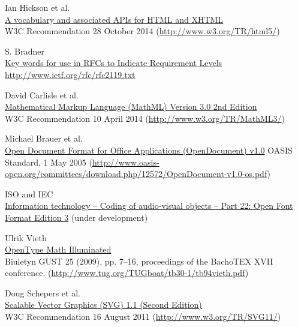 \begin{thebibliography}{25}
Ian Hickson et al. \\
\href{http://www.w3.org/TR/html5/}{A vocabulary and associated APIs for HTML and XHTML} \\
W3C Recommendation 28 October 2014 (\href{http://www.w3.org/TR/html5/}{http://www.w3.org/TR/html5/})

S. Bradner \\
\href{http://www.ietf.org/rfc/rfc2119.txt}{Key words for use in RFCs to Indicate Requirement Levels} \\
\href{http://www.ietf.org/rfc/rfc2119.txt}{http://www.ietf.org/rfc/rfc2119.txt}

David Carlisle et al. \\
\href{http://www.w3.org/TR/MathML3/}{Mathematical Markup Language (MathML) Version 3.0 2nd Edition} \\
W3C Recommendation 10 April 2014 (\href{http://www.w3.org/TR/MathML3/}{http://www.w3.org/TR/MathML3/})

Michael Brauer et al. \\
\href{http://www.oasis-open.org/committees/download.php/12572/OpenDocument-v1.0-os.pdf}{Open Document Format for Office Applications (OpenDocument) v1.0}
OASIS Standard, 1 May 2005 (\href{http://www.oasis-open.org/committees/download.php/12572/OpenDocument-v1.0-os.pdf}{http://www.oasis-open.org/committees/download.php/12572/OpenDocument-v1.0-os.pdf})

ISO and IEC \\
\href{http://www.iso.org/iso/home/store/catalogue\_ics/catalogue\_detail\_ics.htm?csnumber=66391}{Information technology -- Coding of audio-visual objects -- Part 22: Open Font Format Edition 3} (under development)

Ulrik Vieth \\
\href{http://www.tug.org/TUGboat/tb30-1/tb94vieth.pdf}{OpenType Math Illuminated} \\
Biuletyn GUST 25 (2009), pp. 7–16, proceedings of the BachoTEX XVII conference.
(\href{http://www.tug.org/TUGboat/tb30-1/tb94vieth.pdf}{http://www.tug.org/TUGboat/tb30-1/tb94vieth.pdf})

Doug Schepers et al. \\
\href{http://www.w3.org/TR/SVG11/}{Scalable Vector Graphics (SVG) 1.1 (Second Edition)} \\
W3C Recommendation 16 August 2011 (\href{http://www.w3.org/TR/SVG11/}{http://www.w3.org/TR/SVG11/})


\end{thebibliography}
